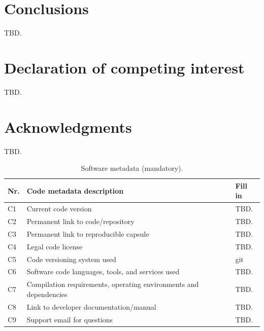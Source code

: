 \documentclass[preprint,review,12pt]{elsarticle}
\begin{document}
\section{Conclusions}
TBD.

\section*{Declaration of competing interest}
TBD.

\section*{Acknowledgments}
TBD.

\begin{table}[h]
\footnotesize
\begin{tabular}{|l|p{5cm}|p{6cm}|}
\hline
\textbf{Nr.} & \textbf{Code metadata description} & \textbf{Fill in} \\
\hline
C1 & Current code version & TBD. \\
C2 & Permanent link to code/repository & TBD. \\ %
C3 & Permanent link to reproducible capsule & TBD. \\ %
C4 & Legal code license & TBD. \\ %
C5 & Code versioning system used & git \\
C6 & Software code languages, tools, and services used & TBD. \\
C7 & Compilation requirements, operating environments and dependencies & TBD. \\
C8 & Link to developer documentation/manual & TBD. \\
C9 & Support email for questions & TBD. \\
\hline
\end{tabular}
\caption{Software metadata (mandatory).}
\end{table}



\end{document}
